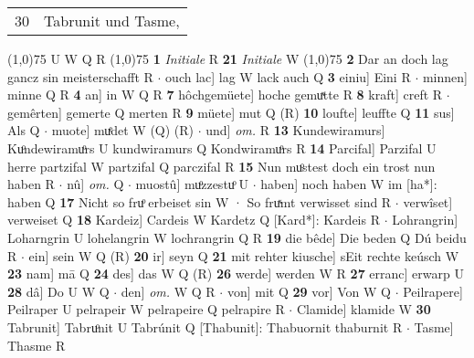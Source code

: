 \documentclass[8pt,a4paper,notitlepage]{article}
\begin{document}
\begin{table}[ht]
\begin{minipage}[t]{0.5\linewidth}
\begin{tabular}{rl}
30 & Tabrunit und Tasme,\\ 
\end{tabular}
\scriptsize
\line(1,0){75} \newline
U W Q R \newline
\line(1,0){75} \newline
\textbf{1} \textit{Initiale} R  \textbf{21} \textit{Initiale} W  \newline
\line(1,0){75} \newline
\textbf{2} Dar an doch lag gancz sin meisterschafft R  $\cdot$ ouch lac] lag W lack auch Q \textbf{3} einiu] Eini R  $\cdot$ minnen] minne Q R \textbf{4} an] in W Q R \textbf{7} hôchgemüete] hoche gemuͯtte R \textbf{8} kraft] creft R  $\cdot$ gemêrten] gemerte Q merten R \textbf{9} müete] mut Q (R) \textbf{10} loufte] leuffte Q \textbf{11} sus] Als Q  $\cdot$ muote] muͤdet W (Q) (R)  $\cdot$ und] \textit{om.} R \textbf{13} Kundewiramurs] Kuͦndewiramuͦrs U kundwiramurs Q Kondwiramuͦrs R \textbf{14} Parcifal] Parzifal U herre partzifal W partzifal Q parczifal R \textbf{15} Nun muͦstest doch ein trost nun haben R  $\cdot$ nû] \textit{om.} Q  $\cdot$ muostû] muͦzzestuͦ U  $\cdot$ haben] noch haben W im [ha*]: haben Q \textbf{17} Nicht so fruͦ erbeiset sin W · So fruͯmt verwisset sind R  $\cdot$ verwîset] verweiset Q \textbf{18} Kardeiz] Cardeis W Kardetz Q [Kard*]: Kardeis R  $\cdot$ Lohrangrin] Loharngrin U lohelangrin W lochrangrin Q R \textbf{19} die bêde] Die beden Q Dú beidu R  $\cdot$ ein] sein W Q (R) \textbf{20} ir] seyn Q \textbf{21} mit rehter kiusche] sEit rechte keúsch W \textbf{23} nam] mā Q \textbf{24} des] das W Q (R) \textbf{26} werde] werden W R \textbf{27} erranc] erwarp U \textbf{28} dâ] Do U W Q  $\cdot$ den] \textit{om.} W Q R  $\cdot$ von] mit Q \textbf{29} vor] Von W Q  $\cdot$ Peilrapere] Peilraper U pelrapeir W pelrapeire Q pelrapire R  $\cdot$ Clamide] klamide W \textbf{30} Tabrunit] Tabruͦnit U Tabrúnit Q [Thabunit]: Thabuornit thaburnit R  $\cdot$ Tasme] Thasme R \newline
\end{minipage}
\end{table}
\end{document}
